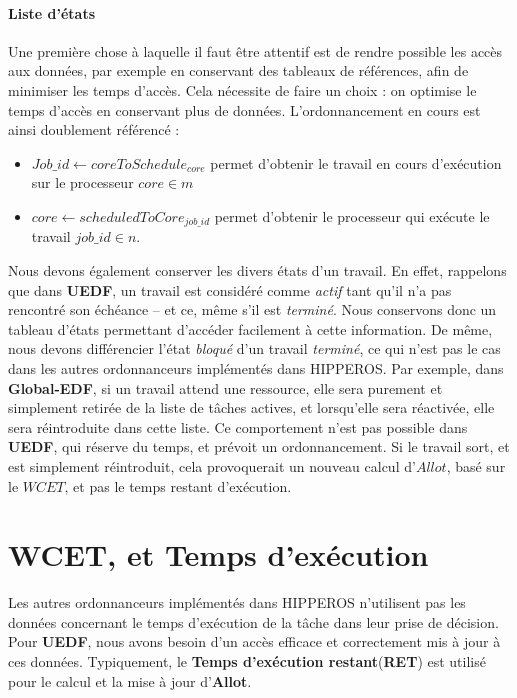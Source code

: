 		\paragraph{Liste d'états}
		Une première chose à laquelle il faut être attentif est de rendre possible les accès 
		aux données, par exemple en conservant des tableaux de références, afin de minimiser les temps 
		d'accès. Cela nécessite de faire un choix : on optimise le temps d'accès en conservant plus de données. 
		L'ordonnancement en cours est ainsi doublement référencé : 
		\begin{itemize}
			\setlength\itemsep{0.1em}
			\item $Job\_id \leftarrow coreToSchedule_{core}$ permet d'obtenir le travail en cours d'exécution sur le processeur $core \in m$
			\item $core \leftarrow scheduledToCore_{job\_id}$ permet d'obtenir le processeur qui exécute le travail $job\_id \in n$.
		\end{itemize}

		Nous devons également conserver les divers états d'un travail. En effet, rappelons que dans \textbf{UEDF}, 
		un travail est considéré comme \textit{actif} tant qu'il n'a pas rencontré son échéance -- et ce, 
		même s'il est \textit{terminé}. Nous conservons donc un tableau d'états permettant 
		d'accéder facilement à cette information.
		De même, nous devons différencier l'état \textit{bloqué} d'un travail \textit{terminé}, ce qui n'est pas le cas 
		dans les autres ordonnanceurs implémentés dans HIPPEROS. Par exemple, dans \textbf{Global-EDF}, si un travail 
		attend une ressource, elle sera purement et simplement retirée de la liste de tâches actives, et lorsqu'elle 
		sera réactivée, elle sera réintroduite dans cette liste. Ce comportement n'est pas possible dans \textbf{UEDF}, 
		qui \og{}réserve\fg{} du temps, et \og{}prévoit\fg{} un ordonnancement. Si le travail sort, et est simplement 
		réintroduit, cela provoquerait un nouveau calcul d'$Allot$, basé sur le $WCET$, et pas le temps restant d'exécution.
		
	\section{WCET, et Temps d'exécution}
		
		Les autres ordonnanceurs implémentés dans HIPPEROS n'utilisent pas les données concernant le temps 
		d'exécution de la tâche dans leur prise de décision. 
		Pour \textbf{UEDF}, nous avons besoin d'un accès efficace et correctement mis à jour à ces données. 
		Typiquement, le \textbf{Temps d'exécution restant}(\textbf{RET}) est utilisé pour le calcul et la mise à jour 
		d'\textbf{Allot}.\newline
		
